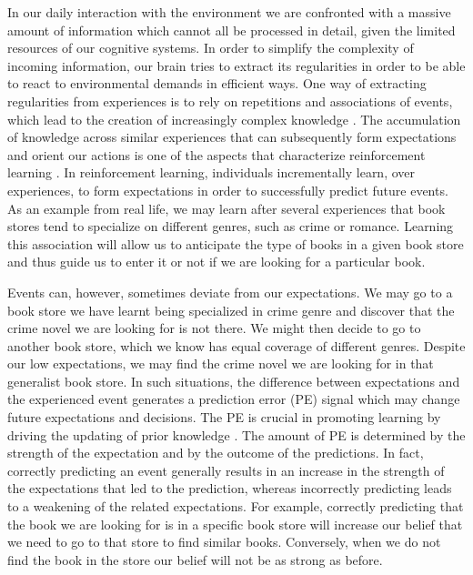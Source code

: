 \documentclass[a4paper,12pt]{article}
\begin{document}

In our daily interaction with the environment we are confronted with a massive amount of information which cannot all be processed in detail, given the limited resources of our cognitive systems. In order to simplify the complexity of incoming information, our brain tries to extract its regularities in order to be able to react to environmental demands in efficient ways. One way of extracting regularities from experiences is to rely on repetitions and associations of events, which lead to the creation of increasingly complex knowledge \citep{Ghosh2014, Tse2007}. The accumulation of knowledge across similar experiences that can subsequently form expectations and orient our actions is one of the aspects that characterize reinforcement learning \citep{Sutton1998}. In reinforcement learning, individuals incrementally learn, over experiences, to form expectations in order to successfully predict future events. As an example from real life, we may learn after several experiences that book stores tend to specialize on different genres, such as crime or romance. Learning this association will allow us to anticipate the type of books in a given book store and thus guide us to enter it or not if we are looking for a particular book. \par 
Events can, however, sometimes deviate from our expectations. We may go to a book store we have learnt being specialized in crime genre and discover that the crime novel we are looking for is not there. We might then decide to go to another book store, which we know has equal coverage of different genres. Despite our low expectations, we may find the crime novel we are looking for in that generalist book store. In such situations, the difference between expectations and the experienced event generates a prediction error (PE) signal which may change future expectations and decisions.  The PE is crucial in promoting learning by driving the updating of prior knowledge \citep{Ergo2020, Friston2018}. The amount of PE is determined by the strength of the expectation and by the outcome of the predictions. %
In fact, correctly predicting an event generally results in an increase in the strength of the expectations that led to the prediction, whereas incorrectly predicting leads to a weakening of the related expectations\citep{Daw2013}. For example, correctly predicting that the book we are looking for is in a specific book store will increase our belief that we need to go to that store to find similar books. Conversely, when we do not find the book in the store our belief will not be as strong as before.
\end{document}
